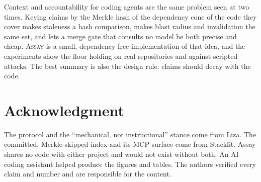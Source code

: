 \documentclass[conference]{IEEEtran}
\newcommand{\assay}{\textsc{Assay}}
\begin{document}
Context and accountability for coding agents are the same problem seen at two times. Keying claims by the Merkle hash of the dependency cone of the code they cover makes staleness a hash comparison, makes blast radius and invalidation the same set, and lets a merge gate that consults no model be both precise and cheap. \assay{} is a small, dependency-free implementation of that idea, and the experiments show the floor holding on real repositories and against scripted attacks. The best summary is also the design rule: claims should decay with the code.

\section*{Acknowledgment}

The protocol and the ``mechanical, not instructional'' stance come from Liza. The committed, Merkle-skipped index and its MCP surface come from Stacklit. Assay shares no code with either project and would not exist without both. An AI coding assistant helped produce the figures and tables. The authors verified every claim and number and are responsible for the content.



\end{document}
